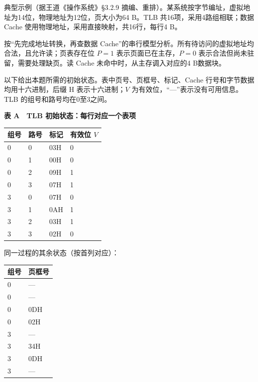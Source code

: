 \begin{example}[配套例题]

典型示例（据王道《操作系统》§3.2.9 摘编、重排）。某系统按字节编址，虚拟地址为14位，物理地址为12位，页大小为64 B。TLB 共16项，采用4路组相联；数据 Cache 使用物理地址，采用直接映射，共16行，每行4 B。

按``先完成地址转换，再查数据 Cache''的串行模型分析。所有待访问的虚拟地址均合法，且允许读；页表存在位 \(P=1\) 表示页面已在主存，\(P=0\) 表示合法但尚未驻留，需要处理缺页。读 Cache 未命中时，从主存调入对应的4 B数据块。

以下给出本题所需的初始状态。表中页号、页框号、标记、Cache 行号和字节数据均用十六进制，后缀 H 表示十六进制；\(V\) 为有效位，``---''表示没有可用信息。TLB 的组号和路号均在0至3之间。

\textbf{表 A　TLB 初始状态：每行对应一个表项}

\begin{wideblock}\par\medskip\noindent\begin{minipage}{\linewidth}\fontsize{9.3}{12}\selectfont\begin{tabularx}{\linewidth}{@{}YYYY@{}}
\toprule\noalign{}
组号 & 路号 & 标记 & 有效位 \(V\) \\
\midrule\noalign{}


0 & 0 & 03H & 0 \\
0 & 1 & 00H & 0 \\
0 & 2 & 09H & 1 \\
0 & 3 & 07H & 1 \\
3 & 0 & 07H & 0 \\
3 & 1 & 0AH & 1 \\
3 & 2 & 03H & 1 \\
3 & 3 & 02H & 0 \\
\bottomrule\end{tabularx}
\end{minipage}\par\medskip\end{wideblock}

同一过程的其余状态（按首列对应）：

\par\medskip\noindent\begin{minipage}{\linewidth}\fontsize{9.3}{12}\selectfont\begin{tabularx}{\linewidth}{@{}YY@{}}
\toprule\noalign{}
组号 & 页框号 \\
\midrule\noalign{}


0 & --- \\
0 & --- \\
0 & 0DH \\
0 & 02H \\
3 & --- \\
3 & 34H \\
3 & 0DH \\
3 & --- \\
\bottomrule\end{tabularx}
\end{minipage}\par\medskip


\end{example}
